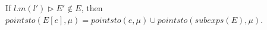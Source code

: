 \documentclass{llncs}
\newcommand{\keywadj}[1]{\mathtt{#1}}
\newcommand{\keyw}[1]{\keywadj{#1}~}
\begin{document}
%
%
%
%
%          
%
%


\newpage

\begin{mdframed}
\begin{lemma}
\label{l:ses-e}
If $l.m(l') \rhd E' \not\in E$, then $pointsto(E[e], \mu) = pointsto(e, \mu) \cup pointsto(subexps(E), \mu)$.
\end{lemma}
\end{mdframed}
\end{document}
